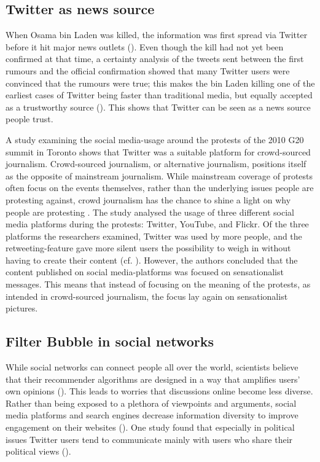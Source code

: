 \subsection{Twitter as news source}  %
When Osama bin Laden was killed, the information was first spread via Twitter before it hit major news outlets (\cite{hu2012breaking}). 
Even though the kill had not yet been confirmed at that time, a certainty analysis of the tweets sent between the first rumours and the official confirmation showed that many Twitter users were convinced that the rumours were true; this makes the bin Laden killing one of the earliest cases of Twitter being faster than traditional media, but equally accepted as a trustworthy source (\cite[2751]{hu2012breaking}). This shows that Twitter can be seen as a news source people trust.

A study examining the social media-usage around the protests of the 2010 G20 summit in Toronto shows that Twitter was a suitable platform for crowd-sourced journalism\cite{poell2012twitter}. Crowd-sourced journalism, or alternative journalism, positions itself as the opposite of mainstream journalism. While mainstream coverage of protests often focus on the events themselves, rather than the underlying issues people are protesting against, crowd journalism has the chance to shine a light on why people are protesting \cite[698]{poell2012twitter}. The study analysed the usage of three different social media platforms during the protests: Twitter, YouTube, and Flickr. Of the three platforms the researchers examined, Twitter was used by more people, and the retweeting-feature gave more silent users the possibility to weigh in without having to create their content (cf. \cite[709]{poell2012twitter}). However, the authors concluded that the content published on social media-platforms was focused on sensationalist messages. This means that instead of focusing on the meaning of the protests, as intended in crowd-sourced journalism, the focus lay again on sensationalist pictures.

\subsection{Filter Bubble in social networks}
While social networks can connect people all over the world, scientists believe that their recommender algorithms are designed in a way that amplifies users' own opinions (\cite{pariser2011filter}). This leads to worries that discussions online become less diverse. Rather than being exposed to a plethora of viewpoints and arguments, social media platforms and search engines decrease information diversity to improve engagement on their websites (\cite{bozdag_breaking_2015}). One study found that especially in political issues Twitter users tend to communicate mainly with users who share their political views (\cite{barbera_tweeting_2015}).

